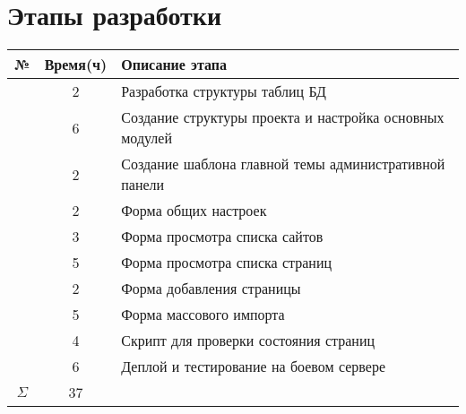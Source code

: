 \documentclass{scrreprt}
\newcounter{magicrownumbers}
\newcommand\rownumber{\stepcounter{magicrownumbers}\arabic{magicrownumbers}}
\begin{document}
\chapter{Этапы разработки}

\begin{tabular}{ccl}
\hline
№ & Время(ч) & Описание этапа \\
\hline
	\rownumber & 2 & Разработка структуры таблиц БД\\
	\rownumber & 6 & Создание структуры проекта и настройка основных модулей\\
	\rownumber & 2 & Создание шаблона главной темы административной панели\\
	\rownumber & 2 & Форма общих настроек\\
	\rownumber & 3 & Форма просмотра списка сайтов\\
	\rownumber & 5 & Форма просмотра списка страниц\\
	\rownumber & 2 & Форма добавления страницы\\
	\rownumber & 5 & Форма массового импорта\\
	\rownumber & 4 & Скрипт для проверки состояния страниц\\
	\rownumber & 6 & Деплой и тестирование на боевом сервере\\
	\hline \hline
	$\Sigma$ & 37 & \\
\hline
\end{tabular}
\end{document}
